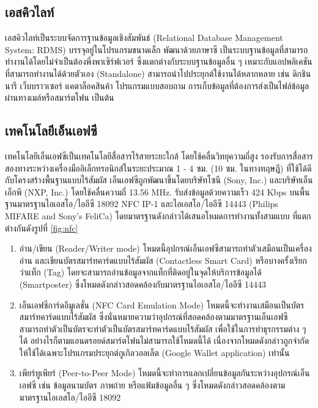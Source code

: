 \documentclass[a4paper]{article}
\begin{document}
\subsection{เอสคิวไลท์}
เอสคิวไลท์เป็นระบบจัดการฐานข้อมูลเชิงสัมพันธ์ (Relational Database Management System: RDMS) บรรจุอยู่ในโปรแกรมขนาดเล็ก พัฒนาด้วยภาษาซี เป็นระบบฐานข้อมูลที่สามารถทำงานได้โดยไม่จำเป็นต้องพึ่งพาเซิร์ฟเวอร์ ซึ่งแตกต่างกับระบบฐานข้อมูลอื่น ๆ เหมาะกับแอปพลิเคชันที่สามารถทำงานได้ด้วยตัวเอง (Standalone) สามารถนำไปประยุกต์ใช้งานได้หลากหลาย เช่น ดิกชินนารี เว็บบราวเซอร์ แคตาล็อคสินค้า โปรแกรมแบบสอบถาม การเก็บข้อมูลที่ต้องการส่งเป็นไฟล์ข้อมูลผ่านทางเมล์หรือสมาร์ตโฟน เป็นต้น

\subsection{เทคโนโลยีเอ็นเอฟซี}
เทคโนโลยีเอ็นเอฟซีเป็นเทคโนโลยีสื่อสารไร้สายระยะใกล้ โดยใช้คลื่นวิทยุความถี่สูง รองรับการสื่อสารสองทางระหว่างเครื่องมืออิเล็กทรอนิกส์ในระยะประมาณ 1 - 4 ซม. (10 ซม. ในทางทฤษฎี) ที่ใช้ได้ดีกับโครงสร้างพื้นฐานแบบไร้สัมผัส เอ็นเอฟซีถูกพัฒนาขึ้นโดยบริษัทโซนี (Sony, Inc.) และบริษัทเอ็นเอ็กพี (NXP, Inc.) โดยใช้คลื่นความถี่ 13.56 MHz. รับส่งข้อมูลด้วยความเร็ว 424 Kbps บนพื้นฐานมาตรฐานไอเอสโอ/ไออีซี 18092 NFC IP-1 \cite{itm:prp-rfid} และไอเอสโอ/ไออีซี 14443 \cite{itm:cicc} (Philips MIFARE and Sony’s FeliCa) โดยมาตรฐานดังกล่าวได้เสนอโหมดการทำงานทั้งสามแบบ \cite{itm:IDA-Pay} ที่แตกต่างกันดังรูปที่ \ref{fig:nfc}

\begin{enumerate}
\item อ่าน/เขียน (Reader/Writer mode) โหมดนี้อุปกรณ์เอ็นเอฟซีสามารถทำตัวเสมือนเป็นเครื่องอ่าน และเขียนบัตรสมาร์ทคาร์ดแบบไร้สัมผัส (Contactless Smart Card) หรือบางครั้งเรียกว่าแท็ก (Tag) โดยจะสามารถอ่านข้อมูลจากแท็กที่ติดอยู่ในจุดให้บริการข้อมูลได้ (Smartposter) ซึ่งโหมดดังกล่าวสอดคล้องกับมาตรฐานไอเอสโอ/ไออีซี 14443

\item เอ็นเอฟซีการ์ดอีมูเลชั่น (NFC Card Emulation Mode) โหมดนี้จะทำงานเสมือนเป็นบัตรสมาร์ทคาร์ดแบบไร้สัมผัส ซึ่งนั่นหมายความว่าอุปกรณ์ที่สอดคล้องตามมาตรฐานเอ็นเอฟซี สามารถทำตัวเป็นบัตรจะทำตัวเป็นบัตรสมาร์ทคาร์ดแบบไร้สัมผัส เพื่อใช้ในการทำธุรกรรมต่าง ๆ ได้ อย่างไรก็ตามแอนดรอยด์สมาร์ตโฟนไม่สามารถใช้โหมดนี้ได้ \cite{itm:IDA-Pay} เนื่องจากโหมดดังกล่าวถูกจำกัดให้ใช้ได้เฉพาะโปรแกรมประยุกต์กูเกิลวอลเล็ต (Google Wallet application) เท่านั้น 

\item เพียร์ทูเพียร์ (Peer-to-Peer Mode) โหมดนี้จะทำการแลกเปลี่ยนข้อมูลกันระหว่างอุปกรณ์เอ็นเอฟซี เช่น ข้อมูลนามบัตร ภาพถ่าย หรือแฟ้มข้อมูลอื่น ๆ ซึ่งโหมดดังกล่าวสอดคล้องตามมาตรฐานไอเอสโอ/ไออีซี 18092
\end{enumerate}
\end{document}
